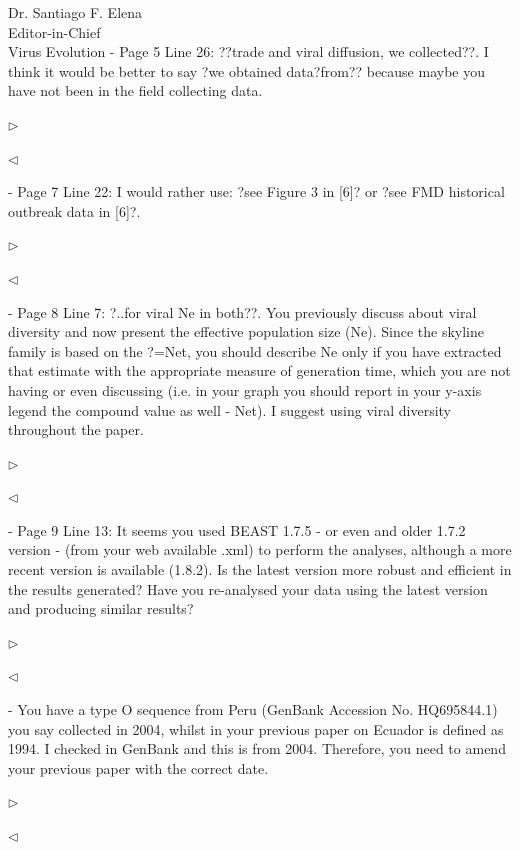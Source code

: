 \documentclass[ucla,biomath,12pt,noaddrfooter,datefrom]{UC_letter}
\newenvironment{reply}{$\triangleright$\bf}{$\triangleleft$}
\begin{document}
\begin{letter}{
Dr. Santiago F. Elena \\
Editor-in-Chief \\
Virus Evolution
}
-       Page 5 Line 26: ??trade and viral diffusion, we collected??. 
I think it would be better to say ?we obtained data?from?? because maybe you have not been in the field collecting data.

\begin{reply}

\end{reply}

-       Page 7 Line 22: I would rather use: ?see Figure 3 in [6]? or ?see FMD historical outbreak data in [6]?.

\begin{reply}

\end{reply}

-       Page 8 Line 7: ?..for viral Ne in both??. 
You previously discuss about viral diversity and now present the effective population size (Ne). 
Since the skyline family is based on the ?=Net, you should describe Ne only if you have extracted that estimate with the appropriate measure of generation time, which you are not having or even discussing (i.e. in your graph you should report in your y-axis legend the compound value as well - Net). 
I suggest using viral diversity throughout the paper.

\begin{reply}

\end{reply}

-       Page 9 Line 13: It seems you used BEAST 1.7.5 - or even and older 1.7.2 version - (from your web available .xml) to perform the analyses, although a more recent version is available (1.8.2). 
Is the latest version more robust and efficient in the results generated? 
Have you re-analysed your data using the latest version and producing similar results?

\begin{reply}

\end{reply}

-       You have a type O sequence from Peru (GenBank Accession No. HQ695844.1) you say collected in 2004, whilst in your previous paper on Ecuador is defined as 1994. 
I checked in GenBank and this is from 2004. 
Therefore, you need to amend your previous paper with the correct date.

\begin{reply}

\end{reply}



\end{letter}
\end{document}

